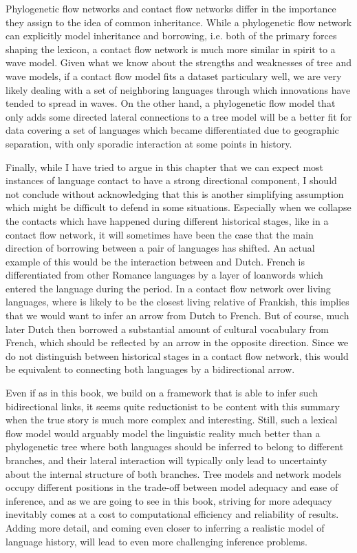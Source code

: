 Phylogenetic flow networks and contact flow networks differ in the importance they assign to the idea of common inheritance. While a phylogenetic flow network can explicitly model inheritance and borrowing, i.e. both of the primary forces shaping the lexicon, a contact flow network is much more similar in spirit to a wave model. Given what we know about the strengths and weaknesses of tree and wave models, if a contact flow model fits a dataset particulary well, we are very likely dealing with a set of neighboring languages through which innovations have tended to spread in waves. On the other hand, a phylogenetic flow model that only adds some directed lateral connections to a tree model will be a better fit for data covering a set of languages which became differentiated due to geographic separation, with only sporadic interaction at some points in history.

Finally, while I have tried to argue in this chapter that we can expect most instances of language contact to have a strong directional component, I should not conclude without acknowledging that this is another simplifying assumption which might be difficult to defend in some situations. Especially when we collapse the contacts which have happened during different historical stages, like in a contact flow network, it will sometimes have been the case that the main direction of borrowing between a pair of languages has shifted. An actual example of this would be the interaction between  and Dutch. French is differentiated from other Romance languages by a layer of  loanwords which entered the language during the  period. In a contact flow network over living languages, where  is likely to be the closest living relative of Frankish, this implies that we would want to infer an arrow from Dutch to French. But of course, much later Dutch then borrowed a substantial amount of cultural vocabulary from French, which should be reflected by an arrow in the opposite direction. Since we do not distinguish between historical stages in a contact flow network, this would be equivalent to connecting both languages by a bidirectional arrow.

\largerpage
Even if as in this book, we build on a framework that is able to infer such bidirectional links, it seems quite reductionist to be content with this summary when the true story is much more complex and interesting. Still, such a lexical flow model would arguably model the linguistic reality much better than a phylogenetic tree where both languages should be inferred to belong to different branches, and their lateral interaction will typically only lead to uncertainty about the internal structure of both branches. Tree models and network models occupy different positions in the trade-off between model adequacy and ease of inference, and as we are going to see in this book, striving for more adequacy inevitably comes at a cost to computational efficiency and reliability of results. Adding more detail, and coming even closer to inferring a realistic model of language history, will lead to even more challenging inference problems.

